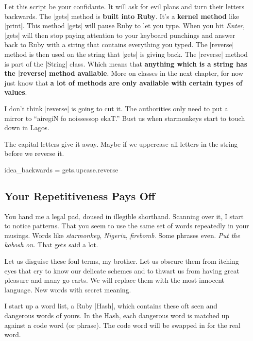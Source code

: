 \documentclass[12pt,twoside]{report}
\begin{document}
Let this script be your confidante.  It will ask for evil plans and
turn their letters backwards. The \rubyinline|gets|
method is {\bf built into Ruby}.  It's a {\bf kernel method} like
\rubyinline|print|.  This method
\rubyinline|gets| will pause Ruby to let you type.
When you hit {\em Enter}, \rubyinline|gets| will then
stop paying attention to your keyboard punchings and answer back to
Ruby with a string that contains everything you typed.  The
\rubyinline|reverse| method is then used on the string
that \rubyinline|gets| is giving back.  The
\rubyinline|reverse| method is part of the
\rubyinline|String| class.  Which means that {\bf
  anything which is a string has the
  \rubyinline|reverse| method available}.  More on
classes in the next chapter, for now just know that {\bf a lot of
  methods are only available with certain types of values}.

I don't think \rubyinline|reverse| is going to cut it.
The authorities only need to put a mirror to ``airegiN fo noissessop
ekaT.''  Bust us when starmonkeys start to touch down in Lagos.

The capital letters give it away.  Maybe if we uppercase all letters
in the string before we reverse it.


\begin{rubycode}
	
 idea_backwards = gets.upcase.reverse

\end{rubycode}




\subsection{Your Repetitiveness Pays Off}



You hand me a legal pad, doused in illegible shorthand.  Scanning over
it, I start to notice patterns.  That you seem to use the same set of
words repeatedly in your musings.  Words like {\em starmonkey}, {\em
  Nigeria}, {\em firebomb}.  Some phrases even.  {\em Put the kabosh
  on.} That gets said a lot.

Let us disguise these foul terms, my brother.  Let us obscure them
from itching eyes that cry to know our delicate schemes and to thwart
us from having great pleasure and many go-carts. We will replace them
with the most innocent language.  New words with secret meaning.

I start up a word list, a Ruby \rubyinline|Hash|,
which contains these oft seen and dangerous words of yours. In the
Hash, each dangerous word is matched up against a code word (or
phrase).  The code word will be swapped in for the real word.
\end{document}
